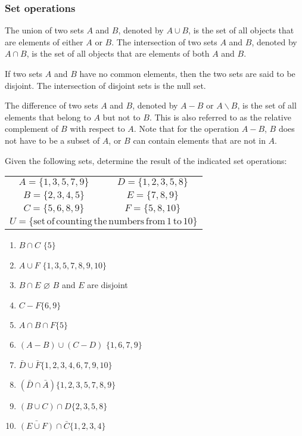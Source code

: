 \subsubsection{Set operations}
The union of two sets $A$ and $B$, denoted by $A\cup B$, is the set of all objects that are elements of either $A$ or $B$. 
The intersection of two sets $A$ and $B$, denoted by $A\cap B$, is the set of all objects that are elements of both $A$ and $B$.

If two sets $A$ and $B$ have no common elements, then the two sets are said to be disjoint. The intersection of disjoint sets is the null set.

The difference of two sets $A$ and $B$, denoted by $A-B$ or $A\backslash B$, is the set of all elements that belong to $A$ but not to $B$. This is also referred to as the relative complement of $B$ with respect to $A$. Note that for the operation $A-B$, $B$ does not have to be a subset of $A$, or $B$ can contain elements that are not in $A$.

Given the following sets, determine the result of the indicated set operations:

\begin{tabularx}{\linewidth}{CC}
$A = \{1, 3, 5, 7, 9\}$ & $D = \{1, 2, 3, 5, 8\}$\\
$B = \{2, 3, 4, 5\}$ & $E = \{7, 8, 9\}$\\
$C = \{5, 6, 8, 9\}$ & $F = \{5, 8, 10\}$\\
 \\
\end{tabularx}

\begin{enumerate}
\item $B\cap C$	\hfil		$\{5\}$
\item $A\cup F$	\hfil 	$\{1, 3, 5, 7, 8, 9, 10\}$
\item $B\cap E$ \hfil $\varnothing$ \hfil	$B$ and $E$ are disjoint
\item $C-F$\hfil $\{6, 9\}$
\item $A\cap B\cap F$\hfil $\{5\}$
\item $(A-B)\cup (C-D)$ \hfil	$\{1, 6, 7, 9\}$
\item $\bar{D}\cup\bar{F}$\hfil $\{1, 2, 3, 4, 6, 7, 9, 10\}$
\item $(\bar{D}\cap\bar{A})$\hfil $\{1, 2, 3, 5, 7, 8, 9\}$
\item $(B\cup C)\cap D$\hfil $\{2, 3, 5, 8\}$
\item $\bar{(E\cup F)}\cap \bar{C}$\hfil $\{1, 2, 3, 4\}$
\end{enumerate}

